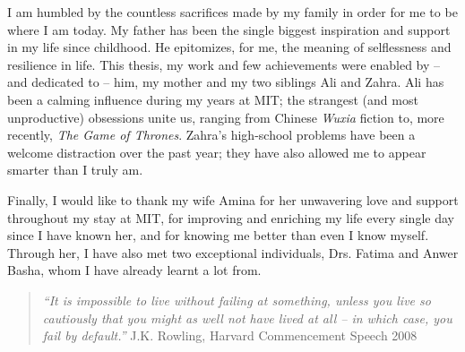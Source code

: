 I am humbled by the countless sacrifices made by my family in order for me to be where I am today. 
My father has been the single biggest inspiration and support in my life since childhood.
He epitomizes, for me, the meaning of selflessness and resilience in life. 
This thesis, my work and few achievements were enabled by -- and dedicated to -- him, my mother and my two siblings Ali and Zahra. Ali has been a calming influence during my years at MIT; the strangest
(and most unproductive) obsessions unite us, ranging from Chinese \emph{Wuxia} fiction to,
more recently, \emph{The Game of Thrones}. Zahra's high-school problems
have been a welcome distraction over the past year; they have also allowed me to appear
smarter than I truly am.

Finally, I would like to thank my wife Amina for her unwavering love and support throughout my stay at MIT, 
for improving and enriching my life every single day since I have known her, and for
knowing me better than even I know myself. 
Through her, I have also met two exceptional individuals, Drs. Fatima and Anwer Basha,
  whom I have already learnt a lot from.  \newline 

\begin{quote}
\emph{``It is impossible to live without failing at something, unless you live so cautiously that you might as well not have
lived at all -- in which case, you fail by default.''} \newline
J.K. Rowling, Harvard Commencement Speech 2008
\end{quote}

